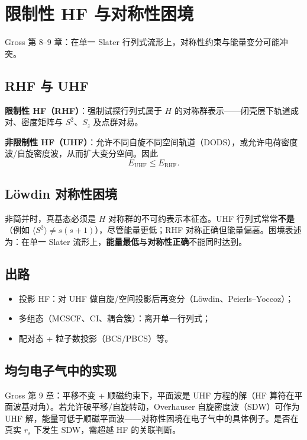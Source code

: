 \section{限制性 HF 与对称性困境}

Gross 第 8--9 章：在单一 Slater 行列式流形上，对称性约束与能量变分可能冲突。

\subsection{RHF 与 UHF}

\textbf{限制性 HF（RHF）}：强制试探行列式属于 $H$ 的对称群表示——闭壳层下轨道成对、密度矩阵与 $S^2$、$S_z$ 及点群对易。

\textbf{非限制性 HF（UHF）}：允许不同自旋不同空间轨道（DODS），或允许电荷密度波/自旋密度波，从而扩大变分空间。因此
\begin{equation}
  E_{\mathrm{UHF}}\le E_{\mathrm{RHF}}.
\end{equation}

\subsection{L\"owdin 对称性困境}

非简并时，真基态必须是 $H$ 对称群的不可约表示本征态。UHF 行列式常常\textbf{不是}（例如 $\langle S^2\rangle\neq s(s+1)$），尽管能量更低；RHF 对称正确但能量偏高。困境表述为：在单一 Slater 流形上，\textbf{能量最低}与\textbf{对称性正确}不能同时达到。

\subsection{出路}

\begin{itemize}
  \item 投影 HF：对 UHF 做自旋/空间投影后再变分（L\"owdin、Peierls--Yoccoz）；
  \item 多组态（MCSCF、CI、耦合簇）：离开单一行列式；
  \item 配对态 + 粒子数投影（BCS/PBCS）等。
\end{itemize}

\subsection{均匀电子气中的实现}

Gross 第 9 章：平移不变 + 顺磁约束下，平面波是 UHF 方程的解（HF 算符在平面波基对角）。若允许破平移/自旋转动，Overhauser 自旋密度波（SDW）可作为 UHF 解，能量可低于顺磁平面波——对称性困境在电子气中的具体例子。是否在真实 $r_s$ 下发生 SDW，需超越 HF 的关联判断。
